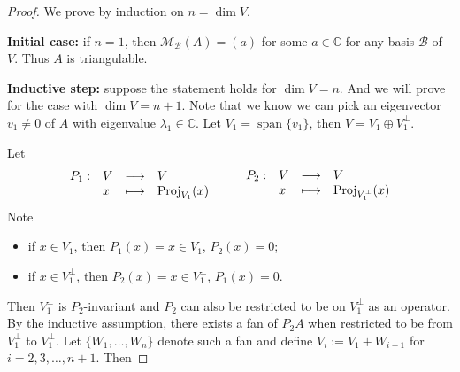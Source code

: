 \documentclass{ctexart}
\newcommand{\C}{\mathbb{C}}
\begin{document}
    \begin{proof}
        We prove by induction on $n = \dim V$.

        \textbf{Initial case:} if $n=1$, then $\mathcal{M}_\mathcal{B}(A) = (a)$ for some $a\in \C$ for any basis $\mathcal{B}$ of $V$. Thus $A$ is triangulable.

        \textbf{Inductive step:} suppose the statement holds for $\dim V = n$. And we will prove for the case with $\dim V = n+1$. Note that we know we can pick an eigenvector $v_1 \ne 0$ of $A$ with eigenvalue $\lambda_1 \in \C$. Let $V_1 = \operatorname{span} \{ v_1 \}$, then $V = V_1 \oplus V_1^\perp$.

        Let
        $$\begin{array}{c l c l}
            P_1 : & V & \longrightarrow & V \\
            & x & \longmapsto & \operatorname{Proj}_{V_1} (x)
        \end{array}\qquad
        \begin{array}{c l c l}
            P_2 : & V & \longrightarrow & V \\
            & x & \longmapsto & \operatorname{Proj}_{V_1^\perp} (x)
        \end{array}
        $$
        Note
        \begin{itemize}
            \item if $x\in V_1$, then $P_1(x) = x \in V_1$, $P_2(x) = 0$;
            \item if $x\in V_1^\perp$, then $P_2(x) = x \in V_1^\perp$, $P_1(x) = 0$.
        \end{itemize}
        
        Then $V_1^\perp$ is $P_2$-invariant and $P_2$ can also be restricted to be on $V_1^\perp$ as an operator. By the inductive assumption, there exists a fan of $P_2 A$ when restricted to be from $V_1^\perp$ to $V_1^\perp$. Let $\{ W_1, \ldots, W_n \}$ denote such a fan and define $V_i := V_1 + W_{i-1}$ for $i=2,3,\ldots,n+1$. Then


\end{proof}
\end{document}
